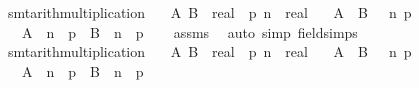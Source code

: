 \begin{isabellebody}
%
\endisadelimproof
\isanewline
{}\isamarkupfalse%
\ {\isacharbrackleft}{\kern0pt}smt{\isacharunderscore}{\kern0pt}arith{\isacharunderscore}{\kern0pt}multiplication{\isacharbrackright}{\kern0pt}{\isacharcolon}{\kern0pt}\isanewline
\ \ \ A\ B\ {\isacharcolon}{\kern0pt}{\isacharcolon}{\kern0pt}\ real\ \ p\ n\ {\isacharcolon}{\kern0pt}{\isacharcolon}{\kern0pt}\ real\isanewline
\ \ \ {\isachardoublequoteopen}A\ {\isasymle}\ B{\isachardoublequoteclose}\ {\isachardoublequoteopen}{}\ {\isacharless}{\kern0pt}\ n{\isachardoublequoteclose}\ {\isachardoublequoteopen}p\ {\isachargreater}{\kern0pt}\ {}{\isachardoublequoteclose}\isanewline
\ \ \ {\isachardoublequoteopen}{\isacharparenleft}{\kern0pt}A\ {\isacharslash}{\kern0pt}\ n{\isacharparenright}{\kern0pt}\ {\isacharasterisk}{\kern0pt}\ p\ {\isasymle}\ {\isacharparenleft}{\kern0pt}B\ {\isacharslash}{\kern0pt}\ n{\isacharparenright}{\kern0pt}\ {\isacharasterisk}{\kern0pt}\ p{\isachardoublequoteclose}\isanewline
%
\isadelimproof
\ \ %
\endisadelimproof
%
\isatagproof
{}\isamarkupfalse%
\ assms\ \isamarkupfalse%
\ {\isacharparenleft}{\kern0pt}auto\ simp{\isacharcolon}{\kern0pt}\ field{\isacharunderscore}{\kern0pt}simps{\isacharparenright}{\kern0pt}%
\endisatagproof
{\isafoldproof}%
%
\isadelimproof
\isanewline
%
\endisadelimproof
\isanewline
{}\isamarkupfalse%
\ {\isacharbrackleft}{\kern0pt}smt{\isacharunderscore}{\kern0pt}arith{\isacharunderscore}{\kern0pt}multiplication{\isacharbrackright}{\kern0pt}{\isacharcolon}{\kern0pt}\isanewline
\ \ \ A\ B\ {\isacharcolon}{\kern0pt}{\isacharcolon}{\kern0pt}\ real\ \ p\ n\ {\isacharcolon}{\kern0pt}{\isacharcolon}{\kern0pt}\ real\isanewline
\ \ \ {\isachardoublequoteopen}A\ {\isacharless}{\kern0pt}\ B{\isachardoublequoteclose}\ {\isachardoublequoteopen}{}\ {\isacharless}{\kern0pt}\ n{\isachardoublequoteclose}\ {\isachardoublequoteopen}p\ {\isachargreater}{\kern0pt}\ {}{\isachardoublequoteclose}\isanewline
\ \ \ {\isachardoublequoteopen}{\isacharparenleft}{\kern0pt}A\ {\isacharslash}{\kern0pt}\ n{\isacharparenright}{\kern0pt}\ {\isacharasterisk}{\kern0pt}\ p\ {\isacharless}{\kern0pt}\ {\isacharparenleft}{\kern0pt}B\ {\isacharslash}{\kern0pt}\ n{\isacharparenright}{\kern0pt}\ {\isacharasterisk}{\kern0pt}\ p{\isachardoublequoteclose}\isanewline
%
\isadelimproof
\ \ %
\endisadelimproof
%
\isatagproof
{}\isamarkupfalse%

\end{isabellebody}
